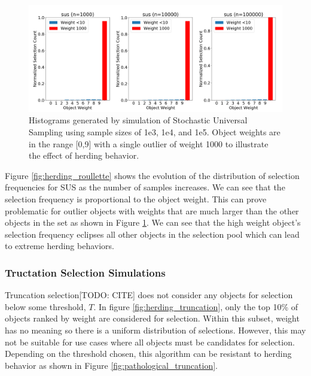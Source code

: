 \documentclass[12pt]{article}
\begin{document}
    \begin{figure}[h]
      \centering
      \includegraphics[scale=0.30]{images/pathological_roullette.png} 
      \caption{Histograms generated by simulation of Stochastic Universal
               Sampling using sample sizes of 1e3, 1e4, and 1e5. Object weights
               are in the range [0,9] with a single outlier of weight 1000 to
               illustrate the effect of herding behavior.}
      \label{fig:pathological_roullette}
    \end{figure}

    Figure \ref{fig:herding_roullette} shows the evolution of the
    distribution of selection frequencies for SUS as the number of samples
    increases. We can see that the selection frequency is proportional to the
    object weight. This can prove problematic for outlier objects with weights
    that are much larger than the other objects in the set as shown in Figure
    \ref{fig:pathological_roullette}. We can see that the high weight object's
    selection frequency eclipses all other objects in the selection pool which
    can lead to extreme herding behaviors.

    \subsubsection{Tructation Selection Simulations}
    Truncation selection[TODO: CITE] does not consider any objects for
    selection below some threshold, $T$. In figure
    \ref{fig:herding_truncation}, only the top 10\% of objects ranked by weight
    are considered for selection. Within this subset, weight has no meaning so
    there is a uniform distribution of selections. However, this may not be
    suitable for use cases where all objects must be candidates for selection.
    Depending on the threshold chosen, this algorithm can be resistant to
    herding behavior as shown in Figure \ref{fig:pathological_truncation}. 
\end{document}
